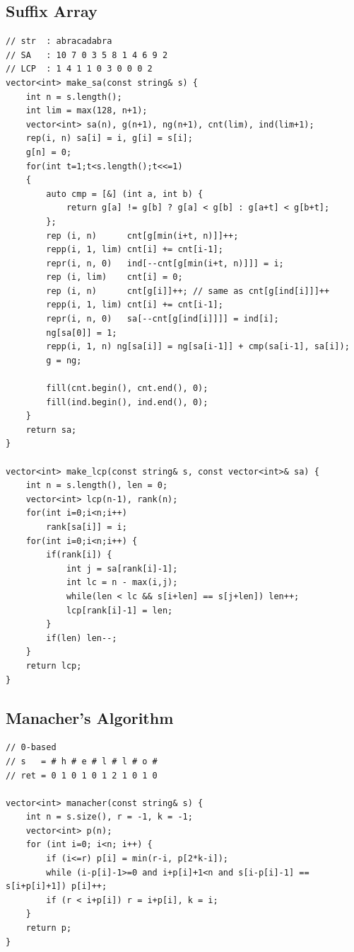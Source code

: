 \documentclass[landscape, 8pt, a4paper, oneside, twocolumn]{extarticle}
\begin{document}
\subsection{Suffix Array}
\begin{verbatim}
// str  : abracadabra
// SA   : 10 7 0 3 5 8 1 4 6 9 2
// LCP  : 1 4 1 1 0 3 0 0 0 2
vector<int> make_sa(const string& s) {
    int n = s.length();
    int lim = max(128, n+1);
    vector<int> sa(n), g(n+1), ng(n+1), cnt(lim), ind(lim+1);
    rep(i, n) sa[i] = i, g[i] = s[i];
    g[n] = 0;
    for(int t=1;t<s.length();t<<=1)
    {
        auto cmp = [&] (int a, int b) {
            return g[a] != g[b] ? g[a] < g[b] : g[a+t] < g[b+t];
        };
        rep (i, n)      cnt[g[min(i+t, n)]]++;
        repp(i, 1, lim) cnt[i] += cnt[i-1];
        repr(i, n, 0)   ind[--cnt[g[min(i+t, n)]]] = i;
        rep (i, lim)    cnt[i] = 0;
        rep (i, n)      cnt[g[i]]++; // same as cnt[g[ind[i]]]++
        repp(i, 1, lim) cnt[i] += cnt[i-1];
        repr(i, n, 0)   sa[--cnt[g[ind[i]]]] = ind[i];
        ng[sa[0]] = 1;
        repp(i, 1, n) ng[sa[i]] = ng[sa[i-1]] + cmp(sa[i-1], sa[i]);
        g = ng;

        fill(cnt.begin(), cnt.end(), 0);
        fill(ind.begin(), ind.end(), 0);
    }
    return sa;
}

vector<int> make_lcp(const string& s, const vector<int>& sa) {
    int n = s.length(), len = 0;
    vector<int> lcp(n-1), rank(n);
    for(int i=0;i<n;i++)
        rank[sa[i]] = i;
    for(int i=0;i<n;i++) {
        if(rank[i]) {
            int j = sa[rank[i]-1];
            int lc = n - max(i,j);
            while(len < lc && s[i+len] == s[j+len]) len++;
            lcp[rank[i]-1] = len;
        }
        if(len) len--;
    }
    return lcp;
}
\end{verbatim}
\subsection{Manacher's Algorithm}
\begin{verbatim}
// 0-based
// s   = # h # e # l # l # o #
// ret = 0 1 0 1 0 1 2 1 0 1 0

vector<int> manacher(const string& s) {
    int n = s.size(), r = -1, k = -1;
    vector<int> p(n);
    for (int i=0; i<n; i++) {
        if (i<=r) p[i] = min(r-i, p[2*k-i]);
        while (i-p[i]-1>=0 and i+p[i]+1<n and s[i-p[i]-1] == s[i+p[i]+1]) p[i]++;
        if (r < i+p[i]) r = i+p[i], k = i;
    }
    return p;
}
\end{verbatim}
\end{document}
